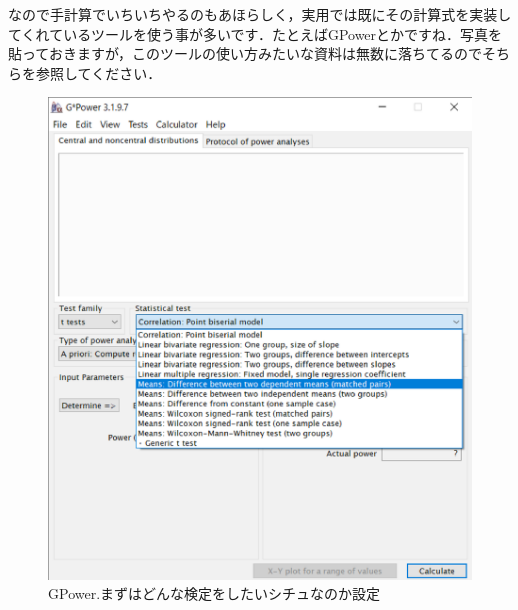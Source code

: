 \documentclass[11pt,a4paper]{ujreport} 	%
\begin{document}
なので手計算でいちいちやるのもあほらしく，実用では既にその計算式を実装してくれているツールを使う事が多いです．たとえばGPowerとかですね．写真を貼っておきますが，このツールの使い方みたいな資料は無数に落ちてるのでそちらを参照してください．\\

\begin{figure}[H]
  \centering
  \includegraphics[width=12cm]{../figures/gpower1.eps}
  \caption{GPower.まずはどんな検定をしたいシチュなのか設定}
\end{figure}
\end{document}
